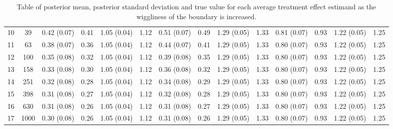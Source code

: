 \documentclass[letter]{article}
\begin{document}
\begin{landscape}
\begin{table}
\begin{tabular}{r|ccccccccccccc}
		10 & 39 & 0.42 (0.07) & 0.41 & 1.05 (0.04) & 1.12 & 0.51 (0.07) & 0.49 & 1.29 (0.05) & 1.33 & 0.81 (0.07) & 0.93 & 1.22 (0.05) & 1.25 \\
		11 & 63 & 0.38 (0.07) & 0.36 & 1.05 (0.04) & 1.12 & 0.44 (0.07) & 0.41 & 1.29 (0.05) & 1.33 & 0.80 (0.07) & 0.93 & 1.22 (0.05) & 1.25 \\
		12 & 100 & 0.35 (0.08) & 0.32 & 1.05 (0.04) & 1.12 & 0.39 (0.08) & 0.35 & 1.29 (0.05) & 1.33 & 0.80 (0.07) & 0.93 & 1.22 (0.05) & 1.25 \\
		13 & 158 & 0.33 (0.08) & 0.30 & 1.05 (0.04) & 1.12 & 0.36 (0.08) & 0.32 & 1.29 (0.05) & 1.33 & 0.80 (0.07) & 0.93 & 1.22 (0.05) & 1.25 \\
		14 & 251 & 0.32 (0.08) & 0.28 & 1.05 (0.04) & 1.12 & 0.34 (0.08) & 0.29 & 1.29 (0.05) & 1.33 & 0.80 (0.07) & 0.93 & 1.22 (0.05) & 1.25 \\
		15 & 398 & 0.31 (0.08) & 0.27 & 1.05 (0.04) & 1.12 & 0.32 (0.08) & 0.28 & 1.29 (0.05) & 1.33 & 0.80 (0.07) & 0.93 & 1.22 (0.05) & 1.25 \\
		16 & 630 & 0.31 (0.08) & 0.26 & 1.05 (0.04) & 1.12 & 0.31 (0.08) & 0.27 & 1.29 (0.05) & 1.33 & 0.80 (0.07) & 0.93 & 1.22 (0.05) & 1.25 \\
		17 & 1000 & 0.30 (0.08) & 0.26 & 1.05 (0.04) & 1.12 & 0.31 (0.08) & 0.26 & 1.29 (0.05) & 1.33 & 0.80 (0.07) & 0.93 & 1.22 (0.05) & 1.25 \\
	\end{tabular}
	\caption{Table of posterior mean, posterior standard deviation and true value for each average treatment effect estimand as the wiggliness of the boundary is increased.}
\end{table}
\end{landscape}
\restoregeometry

    
    
	
	

    
    
\end{document}
